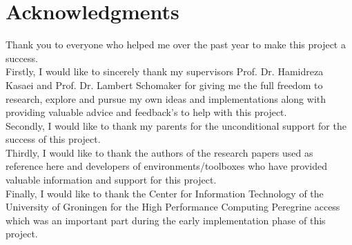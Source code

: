 \thispagestyle{acknowledgements}
\section*{Acknowledgments}

Thank you to everyone who helped me over the past year to make this project a success. \\

Firstly, I would like to sincerely thank my supervisors Prof. Dr. Hamidreza Kasaei and Prof. Dr. Lambert Schomaker for giving me the full freedom to research, explore and pursue my own ideas and implementations along with providing valuable advice and feedback's to help with this project. \\

Secondly, I would like to thank my parents for the unconditional support for the success of this project. \\

Thirdly, I would like to thank the authors of the research papers used as reference here and developers of environments/toolboxes who have provided valuable information and support for this project. \\

Finally, I would like to thank the Center for Information Technology of the University of
Groningen for the High Performance Computing Peregrine access which was an important part during the early implementation phase of this project.

